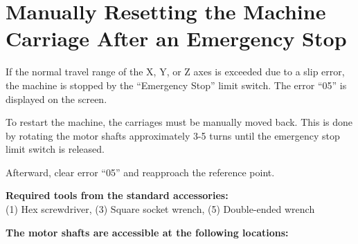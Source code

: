 \section{Manually Resetting the Machine Carriage After an Emergency Stop}

\setcounter{page}{2}
\setcounter{section}{15}

If the normal travel range of the X, Y, or Z axes is exceeded due to a slip error, the machine is stopped by the \enquote{Emergency Stop} limit switch. The error \enquote{05} is displayed on the screen.

\vspace{.3cm}

\noindent To restart the machine, the carriages must be manually moved back. This is done by rotating the motor shafts approximately 3-5 turns until the emergency stop limit switch is released.

\vspace{.3cm}

\noindent Afterward, clear error \enquote{05} and reapproach the reference point.

\vspace{.3cm}



\noindent \textbf{Required tools from the standard accessories:}\\
(1) Hex screwdriver, (3) Square socket wrench, (5) Double-ended wrench

\vspace{2cm}

\noindent \textbf{The motor shafts are accessible at the following locations:}  

